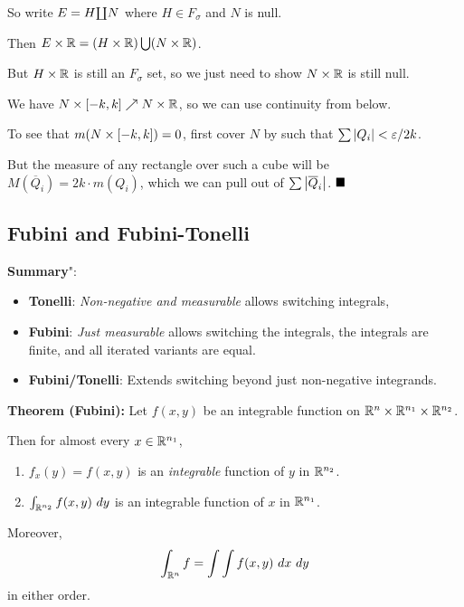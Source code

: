 So write \(E = H {\coprod} N\) where \(H\in F_\sigma\) and \(N\) is
null.

Then \(E \times {\mathbb{R}} = (H \times {\mathbb{R}}) \bigcup (N \times {\mathbb{R}})\).

But \(H\times {\mathbb{R}}\) is still an \(F_\sigma\) set, so we just need to
show \(N\times {\mathbb{R}}\) is still null.

We have \(N \times [-k, k] \nearrow N \times {\mathbb{R}}\), so we can use
continuity from below.

To see that \(m(N \times [-k, k]) = 0\), first cover \(N\) by such that
\(\sum {\left\lvert {Q_i} \right\rvert} < \varepsilon / 2k\).

But the measure of any rectangle over such a cube will be
\(M(\overline{Q}_i) = 2 k \cdot m(Q_i)\), which we can pull out of
\(\sum {\left\lvert {\overline{Q}_i} \right\rvert}\). \(\qed\)

\hypertarget{fubini-and-fubini-tonelli}{%
\subsection{Fubini and Fubini-Tonelli}\label{fubini-and-fubini-tonelli}}

\textbf{Summary}":

\begin{itemize}
\item
  \textbf{Tonelli}: \emph{Non-negative and measurable} allows switching
  integrals,
\item
  \textbf{Fubini}: \emph{Just measurable} allows switching the
  integrals, the integrals are finite, and all iterated variants are
  equal.
\item
  \textbf{Fubini/Tonelli}: Extends switching beyond just non-negative
  integrands.
\end{itemize}

\textbf{Theorem (Fubini):} Let \(f(x, y)\) be an integrable function on
\({\mathbb{R}}^n \times {\mathbb{R}}^{n_1} \times {\mathbb{R}}^{n_2}\).

Then for almost every \(x\in {\mathbb{R}}^{n_1}\),

\begin{enumerate}
\def\labelenumi{\arabic{enumi}.}
\item
  \(f_x(y) = f(x, y)\) is an \emph{integrable} function of \(y\) in
  \({\mathbb{R}}^{n_2}\).
\item
  \(\int_{{\mathbb{R}}^{n_2}} f(x, y) ~dy\) is an integrable function of \(x\) in
  \({\mathbb{R}}^{n_1}\).
\end{enumerate}

Moreover,
\begin{align*}
\int_{{\mathbb{R}}^n} f = \int \int f(x, y) ~dx~dy
\end{align*} in either order.

